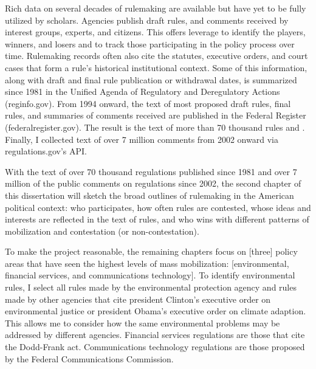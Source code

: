 Rich data on several decades of rulemaking are available but have yet to be fully utilized by scholars.  Agencies publish draft rules, and comments received by interest groups, experts, and citizens. This offers leverage to identify the players, winners, and losers and to track those participating in the policy process over time. Rulemaking records often also cite the statutes, executive orders, and court cases that form a rule's historical institutional context. Some of this information, along with draft and final rule publication or withdrawal dates, is summarized since 1981 in the Unified Agenda of Regulatory and Deregulatory Actions (reginfo.gov). From 1994 onward, the text of most proposed draft rules, final rules, and summaries of comments received are published in the Federal Register (federalregister.gov). The result is the text of more than 70 thousand rules and . Finally, I collected text of over 7 million comments from 2002 onward via regulations.gov's API.

With the text of over 70 thousand regulations published since 1981 and over 7 million of the public comments on regulations since 2002, the second chapter of this dissertation will sketch the broad outlines of rulemaking in the American political context: who participates, how often rules are contested, whose ideas and interests are reflected in the text of rules, and who wins with different patterns of mobilization and contestation (or non-contestation). 

To make the project reasonable, the remaining chapters focus on [three] policy areas that have seen the highest levels of mass mobilization: [environmental, financial services, and communications technology]. To identify environmental rules, I select all rules made by the environmental protection agency and rules made by other agencies that cite president Clinton's executive order on environmental justice or president Obama's executive order on climate adaption. This allows me to consider how the same environmental problems may be addressed by different agencies. Financial services regulations are those that cite the Dodd-Frank act. Communications technology regulations are those proposed by the Federal Communications Commission.

